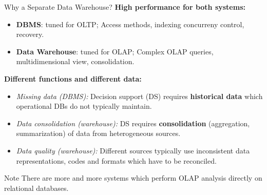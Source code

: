 \begin{frame}{Why a Separate Data Warehouse?}
	\textbf{High performance for both systems:}
	\begin{itemize}
		\item \textbf{\color{airforceblue}DBMS}: tuned for OLTP; Access methods,
		      indexing concurreny control, recovery.
		\item \textbf{\color{airforceblue}Data Warehouse}: tuned for OLAP; Complex OLAP
		      queries, multidimensional view, consolidation.
	\end{itemize}
	\textbf{Different functions and different data:}
	\begin{itemize}
		\item \textit{Missing data (DBMS):} Decision support (DS) requires \textbf{\color{airforceblue}historical data} which operational DBs do not typically maintain.
		\item \textit{Data consolidation (warehouse):} DS requires \textbf{\color{airforceblue}consolidation} (aggregation, summarization) of data from heterogeneous sources.
		\item \textit{Data quality (warehouse):} Different sources typically use inconsistent data representations, codes and formats which have to be reconciled.
	\end{itemize}

	\begin{alertblock}{Note}
		There are more and more systems which perform OLAP analysis directly on relational databases.
	\end{alertblock}
\end{frame}

